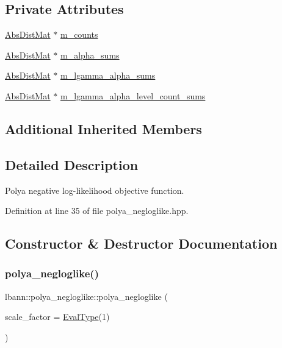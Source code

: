 \subsection*{Private Attributes}
\begin{DoxyCompactItemize}
\item 
\hyperlink{base_8hpp_a9a697a504ae84010e7439ffec862b470}{Abs\+Dist\+Mat} $\ast$ \hyperlink{classlbann_1_1polya__negloglike_a441387814cd7deafb1f70c91926d3004}{m\+\_\+counts}
\item 
\hyperlink{base_8hpp_a9a697a504ae84010e7439ffec862b470}{Abs\+Dist\+Mat} $\ast$ \hyperlink{classlbann_1_1polya__negloglike_aa77620f256de700ae8b3ca921957bcd1}{m\+\_\+alpha\+\_\+sums}
\item 
\hyperlink{base_8hpp_a9a697a504ae84010e7439ffec862b470}{Abs\+Dist\+Mat} $\ast$ \hyperlink{classlbann_1_1polya__negloglike_a0aec768ffa50a8b716149d597699eddb}{m\+\_\+lgamma\+\_\+alpha\+\_\+sums}
\item 
\hyperlink{base_8hpp_a9a697a504ae84010e7439ffec862b470}{Abs\+Dist\+Mat} $\ast$ \hyperlink{classlbann_1_1polya__negloglike_a78c9da1fb83c7b79a12cfbf30a4cb59e}{m\+\_\+lgamma\+\_\+alpha\+\_\+level\+\_\+count\+\_\+sums}
\end{DoxyCompactItemize}
\subsection*{Additional Inherited Members}


\subsection{Detailed Description}
Polya negative log-\/likelihood objective function. 

Definition at line 35 of file polya\+\_\+negloglike.\+hpp.



\subsection{Constructor \& Destructor Documentation}
\mbox{\label{classlbann_1_1polya__negloglike_a3f3c7f775d548ac8e011fb1b637804cb}} 
\subsubsection{\texorpdfstring{polya\+\_\+negloglike()}{polya\_negloglike()}\hspace{0.1cm}{\footnotesize\ttfamily [1/2]}}
{\footnotesize\ttfamily lbann\+::polya\+\_\+negloglike\+::polya\+\_\+negloglike (\begin{DoxyParamCaption}\item[{\hyperlink{base_8hpp_a3266f5ac18504bbadea983c109566867}{Eval\+Type}}]{scale\+\_\+factor = {\ttfamily \hyperlink{base_8hpp_a3266f5ac18504bbadea983c109566867}{Eval\+Type}(1)} }\end{DoxyParamCaption})}

